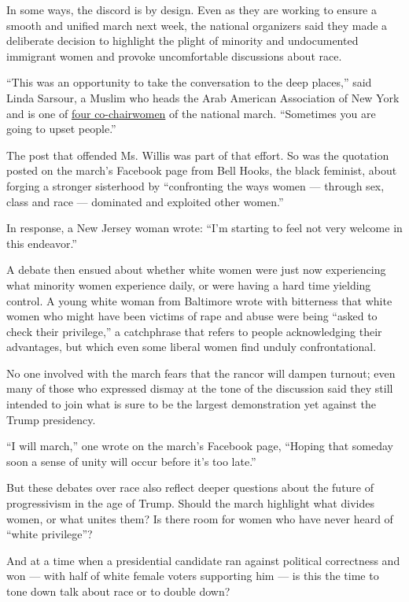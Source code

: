 In some ways, the discord is by design. Even as they are working to
ensure a smooth and unified march next week, the national organizers
said they made a deliberate decision to highlight the plight of minority
and undocumented immigrant women and provoke uncomfortable discussions
about race.

``This was an opportunity to take the conversation to the deep places,''
said Linda Sarsour, a Muslim who heads the Arab American Association of
New York and is one of \href{https://www.womensmarch.com/team/}{four
co-chairwomen} of the national march. ``Sometimes you are going to upset
people.''

The post that offended Ms. Willis was part of that effort. So was the
quotation posted on the march's Facebook page from Bell Hooks, the black
feminist, about forging a stronger sisterhood by ``confronting the ways
women --- through sex, class and race --- dominated and exploited other
women.''

In response, a New Jersey woman wrote: ``I'm starting to feel not very
welcome in this endeavor.''

A debate then ensued about whether white women were just now
experiencing what minority women experience daily, or were having a hard
time yielding control. A young white woman from Baltimore wrote with
bitterness that white women who might have been victims of rape and
abuse were being ``asked to check their privilege,'' a catchphrase that
refers to people acknowledging their advantages, but which even some
liberal women find unduly confrontational.

No one involved with the march fears that the rancor will dampen
turnout; even many of those who expressed dismay at the tone of the
discussion said they still intended to join what is sure to be the
largest demonstration yet against the Trump presidency.

``I will march,'' one wrote on the march's Facebook page, ``Hoping that
someday soon a sense of unity will occur before it's too late.''

But these debates over race also reflect deeper questions about the
future of progressivism in the age of Trump. Should the march highlight
what divides women, or what unites them? Is there room for women who
have never heard of ``white privilege''?

And at a time when a presidential candidate ran against political
correctness and won --- with half of white female voters supporting him
--- is this the time to tone down talk about race or to double down?

